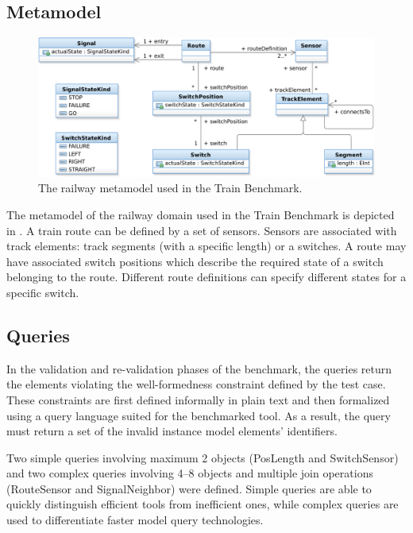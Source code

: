 \subsection{Metamodel}
\label{sec:domain}

\begin{figure}[htb!]
\begin{center}
\includegraphics[width=1\columnwidth]{figures/TrainMM.pdf}
\caption{The railway metamodel used in the Train Benchmark.}
\label{fig:metamodel}
\end{center}
\end{figure}


The metamodel of the railway domain used in the Train Benchmark is depicted in . A train \textsf{route} can be defined by a set of \textsf{sensors}. Sensors are associated with \textsf{track elements}: track \textsf{segment}s (with a specific length) or a \textsf{switch}es. A route may have associated \textsf{switch positions} which describe the required state of a switch belonging to the route. Different route definitions can specify different states for a specific switch.
 
\subsection{Queries}
\label{sec:queries}

In the validation and re-validation phases of the benchmark, the queries return the elements violating the well-formedness constraint defined by the test case. These constraints are first defined informally in plain text and then formalized using a query language suited for the benchmarked tool. As a result, the query must return a set of the invalid instance model elements' identifiers.
 
Two simple queries involving maximum 2 objects (\textsf{PosLength} and \textsf{SwitchSensor}) and two complex queries involving 4--8 objects and multiple join operations (\textsf{RouteSensor} and \textsf{SignalNeighbor}) were defined. Simple queries are able to quickly distinguish efficient tools from inefficient ones, while complex queries are used to differentiate faster model query technologies.
 
